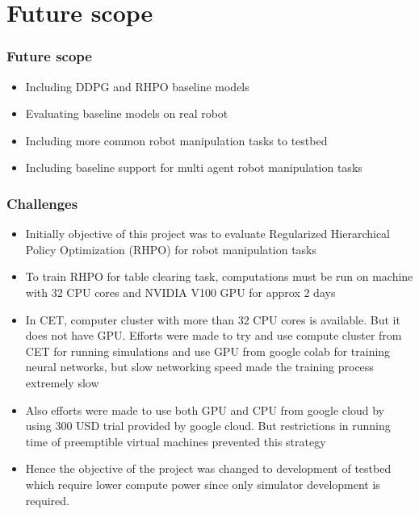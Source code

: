 \documentclass{beamer}
\begin{document}
	\section{Future scope}
	\begin{frame}
		\frametitle{Future scope}
		
		\begin{itemize}
			\item Including DDPG and RHPO baseline models
			\item Evaluating baseline models on real robot
			\item Including more common robot manipulation tasks to testbed
			\item Including baseline support for multi agent robot manipulation tasks
		\end{itemize}
	\end{frame}

	\begin{frame}[allowframebreaks]
		\frametitle{Challenges}
		
		\begin{itemize}
			\item Initially objective of this project was to evaluate Regularized Hierarchical Policy Optimization (RHPO) for robot manipulation tasks
			\item To train RHPO for table clearing task, computations must be run on machine with 32 CPU cores and NVIDIA V100 GPU for approx 2 days
			\item In CET, computer cluster with more than 32 CPU cores is available. But it does not have GPU. Efforts were made to try and use compute cluster from CET for running simulations and use GPU from google colab for training neural networks, but slow networking speed made the training process extremely slow
			\item Also efforts were made to use both GPU and CPU from google cloud by using 300 USD trial provided by google cloud. But restrictions in running time of preemptible virtual machines prevented this strategy
			\item Hence the objective of the project was changed to development of testbed which require lower compute power since only simulator development is required.
		\end{itemize}
	\end{frame}
\end{document}

